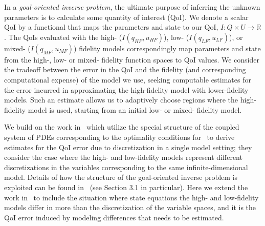 \documentclass[review,sort&compress]{elsarticle}
\newcommand{\R}{{\mathbb{R}}}
\theoremstyle{plain} %
\theoremstyle{definition} %
\begin{document}
In a {\em goal-oriented inverse problem}, the ultimate purpose of inferring the unknown parameters is to calculate some quantity of interest (QoI). We denote a scalar QoI by a functional that maps the parameters and state to our QoI, $I:Q \times U \to \R$. The QoIs evaluated with the high- ($I(q_{HF},u_{HF})$), low- ($I(q_{LF},u_{LF})$), or mixed- ($I(q_{MF},u_{MF})$) fidelity models correspondingly map parameters and state from the high-, low- or mixed- fidelity function spaces to QoI values. We consider the tradeoff between the error in the QoI and the fidelity (and corresponding computational expense) of the model we use, seeking computable estimates for the error incurred in approximating the high-fidelity model with lower-fidelity models. Such an estimate allows us to adaptively choose regions where the high-fidelity model is used, starting from an initial low- or mixed- fidelity model.


We build on the work in~\cite{BecVex05, becker2004posteriori} which utilize the special structure of the coupled system of PDEs corresponding to the optimality conditions for~ to derive estimates for the QoI error due to discretization in a single model setting; they consider the case where the high- and low-fidelity models represent different discretizations in the variables corresponding to the same infinite-dimensional model. Details of how the structure of the goal-oriented inverse problem is exploited can be found in~\cite{becker2004posteriori} (see Section 3.1 in particular). Here we extend the work in~\cite{BecVex05} to include the situation where state equations the high- and low-fidelity models differ in more than the discretization of the variable spaces, and it is the QoI error induced by modeling differences that needs to be estimated.
\end{document}

